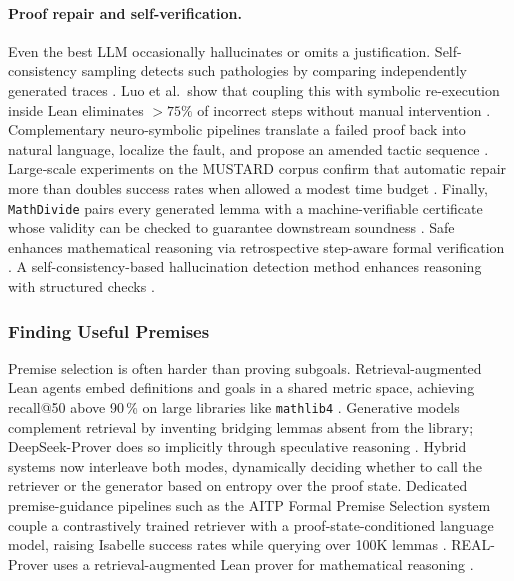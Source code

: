 \documentclass[acmsmall,anonymous]{acmart}
\begin{document}
\paragraph{Proof repair and self-verification.}
Even the best LLM occasionally hallucinates or omits a justification.  Self-consistency sampling detects such pathologies by comparing independently generated traces \cite{lewkowycz2022solving,lewkowycz2023donttrustverify}.  Luo et al.\ show that coupling this with symbolic re-execution inside Lean eliminates $>75\%$ of incorrect steps without manual intervention \cite{gupta2024saas}.  Complementary neuro-symbolic pipelines translate a failed proof back into natural language, localize the fault, and propose an amended tactic sequence \cite{jiang2023automated,jackson2024neurosymbolic}.  Large‐scale experiments on the MUSTARD corpus confirm that automatic repair more than doubles success rates when allowed a modest time budget \cite{huang2024mustard}.  Finally, \texttt{MathDivide} pairs every generated lemma with a machine-verifiable certificate whose validity can be checked to guarantee downstream soundness \cite{romera2024mathematical}. Safe enhances mathematical reasoning via retrospective step-aware formal verification \cite{liu-etal-2025-safe}. A self-consistency-based hallucination detection method enhances reasoning with structured checks \cite{liu2025}.

\subsubsection{Finding Useful Premises}\label{sec:premise}
Premise selection is often harder than proving subgoals.  Retrieval-augmented Lean agents embed definitions and goals in a shared metric space, achieving recall@50 above 90\,\% on large libraries like \texttt{mathlib4} \cite{yang2023leandojo}.  Generative models complement retrieval by inventing bridging lemmas absent from the library; DeepSeek-Prover does so implicitly through speculative reasoning \cite{xin2024deepseek}.  Hybrid systems now interleave both modes, dynamically deciding whether to call the retriever or the generator based on entropy over the proof state.  Dedicated premise-guidance pipelines such as the AITP Formal Premise Selection system couple a contrastively trained retriever with a proof-state-conditioned language model, raising Isabelle success rates while querying over 100K lemmas \cite{tworkowski-2022-formal-premise}. REAL-Prover uses a retrieval-augmented Lean prover for mathematical reasoning \cite{shen2025realprover}.
\end{document}
